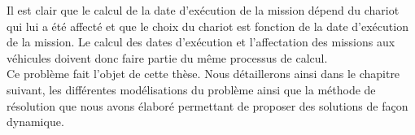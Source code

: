 Il est clair que le calcul de la date d'exécution de la mission dépend du chariot qui lui a été affecté et que le choix du chariot est fonction de la date d'exécution de la mission. Le calcul des dates d'exécution et l'affectation des missions aux véhicules doivent donc faire partie du même processus de calcul.\\

Ce problème fait l'objet de cette thèse. Nous détaillerons ainsi dans le chapitre suivant, les différentes modélisations du problème ainsi que la méthode de résolution que nous avons élaboré permettant de proposer des solutions de façon dynamique.
